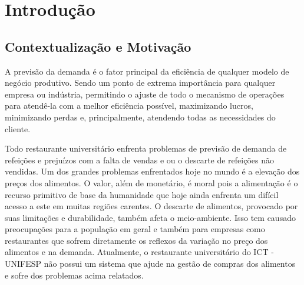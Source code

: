 \documentclass[	12pt, Times, openright, twoside, a4paper, english, brazil]{abntex2}
\begin{document}

    \tableofcontents*
    \cleardoublepage

  \textual

  \chapter{Introdução}
      \section{Contextualização e Motivação}

        \noindent 
        A previsão da demanda é o fator principal da eficiência de qualquer modelo de negócio produtivo. Sendo um ponto de extrema importância para qualquer empresa ou indústria, permitindo o ajuste de todo o mecanismo de operações para atendê-la com a melhor eficiência possível, maximizando lucros, minimizando perdas e, principalmente, atendendo todas as necessidades do cliente.
        
        Todo restaurante universitário enfrenta problemas de previsão de demanda de refeições e prejuízos com a falta de vendas e ou o descarte de refeições não vendidas. Um dos grandes problemas enfrentados hoje no mundo é a elevação dos preços dos alimentos. O valor, além de monetário, é moral pois a alimentação é o recurso primitivo de base da humanidade que hoje ainda enfrenta um difícil acesso a este em muitas regiões carentes. O descarte de alimentos, provocado por suas limitações e durabilidade, também afeta o meio-ambiente. Isso tem causado preocupações para a população em geral e também para empresas como restaurantes que sofrem diretamente os reflexos da variação no preço dos alimentos e na demanda. Atualmente, o restaurante universitário do ICT - UNIFESP não possui um sistema que ajude na gestão de compras dos alimentos e sofre dos problemas acima relatados.
\end{document}
